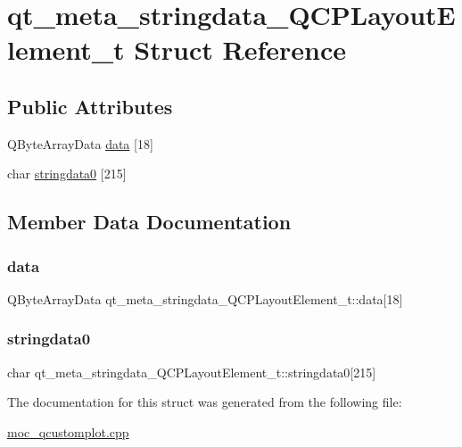 \hypertarget{structqt__meta__stringdata__QCPLayoutElement__t}{}\section{qt\+\_\+meta\+\_\+stringdata\+\_\+\+Q\+C\+P\+Layout\+Element\+\_\+t Struct Reference}
\label{structqt__meta__stringdata__QCPLayoutElement__t}
\subsection*{Public Attributes}
\begin{DoxyCompactItemize}
\item 
Q\+Byte\+Array\+Data \mbox{\hyperlink{structqt__meta__stringdata__QCPLayoutElement__t_aa6e9ae146c405cc7662ce88d1aaa7569}{data}} \mbox{[}18\mbox{]}
\item 
char \mbox{\hyperlink{structqt__meta__stringdata__QCPLayoutElement__t_a52a85794683573e29541c60c3cd4eefb}{stringdata0}} \mbox{[}215\mbox{]}
\end{DoxyCompactItemize}


\subsection{Member Data Documentation}
\mbox{\label{structqt__meta__stringdata__QCPLayoutElement__t_aa6e9ae146c405cc7662ce88d1aaa7569}} 
\subsubsection{\texorpdfstring{data}{data}}
{\footnotesize\ttfamily Q\+Byte\+Array\+Data qt\+\_\+meta\+\_\+stringdata\+\_\+\+Q\+C\+P\+Layout\+Element\+\_\+t\+::data\mbox{[}18\mbox{]}}

\mbox{\label{structqt__meta__stringdata__QCPLayoutElement__t_a52a85794683573e29541c60c3cd4eefb}} 
\subsubsection{\texorpdfstring{stringdata0}{stringdata0}}
{\footnotesize\ttfamily char qt\+\_\+meta\+\_\+stringdata\+\_\+\+Q\+C\+P\+Layout\+Element\+\_\+t\+::stringdata0\mbox{[}215\mbox{]}}



The documentation for this struct was generated from the following file\+:\begin{DoxyCompactItemize}
\item 
\mbox{\hyperlink{moc__qcustomplot_8cpp}{moc\+\_\+qcustomplot.\+cpp}}\end{DoxyCompactItemize}
